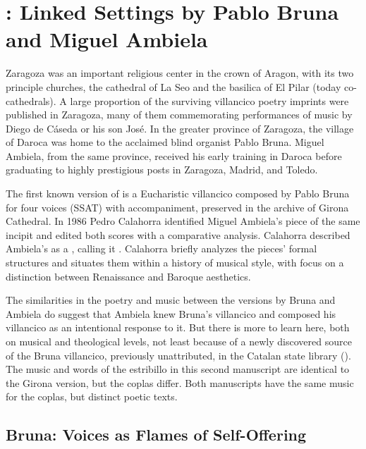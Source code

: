 \section{: Linked Settings by Pablo Bruna
and Miguel Ambiela}

Zaragoza was an important religious center in the crown of Aragon, with its two
principle churches, the cathedral of La Seo and the basilica of El Pilar (today
co-cathedrals).  
A large proportion of the surviving villancico poetry imprints were published
in Zaragoza, many of them commemorating performances of music by Diego de
Cáseda or his son José.
In the greater province of Zaragoza, the village of Daroca was home to the
acclaimed blind organist Pablo Bruna.  
Miguel Ambiela, from the same province, received his early training in Daroca
before graduating to highly prestigious posts in Zaragoza, Madrid, and Toledo.

The first known version of  is a Eucharistic
villancico composed by Pablo Bruna for four voices (SSAT) with accompaniment,
preserved in the archive of Girona Cathedral.%
    \citXXX[signature]
In 1986 Pedro Calahorra identified Miguel Ambiela's piece of the same incipit
and edited both scores with a comparative analysis.
Calahorra described Ambiela's  as a , calling it .%
    \Autocite[9]{Calahorra:Suban}
Calahorra briefly analyzes the pieces' formal structures and situates them
within a history of musical style, with focus on a distinction between
Renaissance and Baroque aesthetics.

The similarities in the poetry and music between the versions by Bruna and
Ambiela do suggest that Ambiela knew Bruna's villancico and composed his
villancico as an intentional response to it.
But there is more to learn here, both on musical and theological levels, not
least because of a newly discovered source of the Bruna villancico, previously
unattributed, in the Catalan state library ().
The music and words of the estribillo in this second manuscript are identical
to the Girona version, but the coplas differ.  
Both manuscripts have the same music for the coplas, but distinct poetic texts.

\subsection{Bruna: Voices as Flames of Self-Offering}

